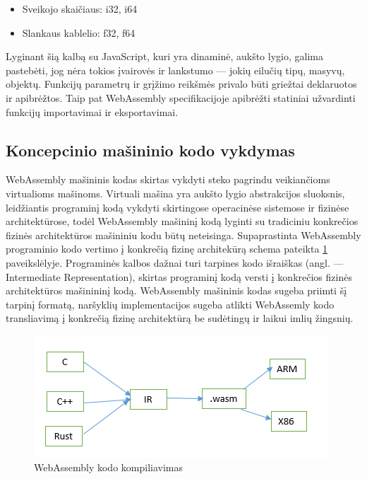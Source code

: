 \documentclass{VUMIFPSkursinis}
\begin{document}
\begin{itemize}
    \item Sveikojo skaičiaus: i32, i64
    \item Slankaus kablelio: f32, f64
\end{itemize}
Lyginant šią kalbą su JavaScript, kuri yra dinaminė, aukšto lygio, galima pastebėti, jog nėra tokios įvairovės ir lankstumo — jokių eilučių tipų, masyvų, objektų. Funkcijų parametrų ir grįžimo reikšmės privalo būti griežtai deklaruotos ir apibrėžtos. Taip pat WebAssembly specifikacijoje apibrėžti statiniai užvardinti funkcijų importavimai ir eksportavimai.


\subsection{Koncepcinio mašininio kodo vykdymas}
WebAssembly mašininis kodas skirtas vykdyti steko pagrindu veikiančioms virtualioms mašinoms. Virtuali mašina yra aukšto lygio abstrakcijos sluoksnis, leidžiantis programinį kodą vykdyti skirtingose operacinėse sistemose ir fizinėse architektūrose, todėl WebAssembly mašininį kodą lyginti su tradiciniu konkrečios fizinės architektūros mašininiu kodu būtų neteisinga. \cite{Cal17} Supaprastinta WebAssembly programinio kodo vertimo į konkrečią fizinę architekūrą schema pateikta \ref{fig:wasm_compilation} paveikslėlyje. Programinės kalbos dažnai turi tarpines kodo išraiškas (angl. — Intermediate Representation), skirtas programinį kodą versti į konkrečios fizinės architektūros mašinininį kodą. WebAssembly mašininis kodas sugeba priimti šį tarpinį formatą, naršyklių implementacijos sugeba atlikti WebAssemly kodo transliavimą į konkrečią fizinę architektūrą be sudėtingų ir laikui imlių žingsnių. 

\begin{figure}[h!]
  \begin{center}
  \includegraphics[scale=1]{webassembly_kompiliavimas.png}
  \end{center}
  \caption{WebAssembly kodo kompiliavimas \cite{Cla17}}
  \label{fig:wasm_compilation}
\end{figure}
\end{document}
